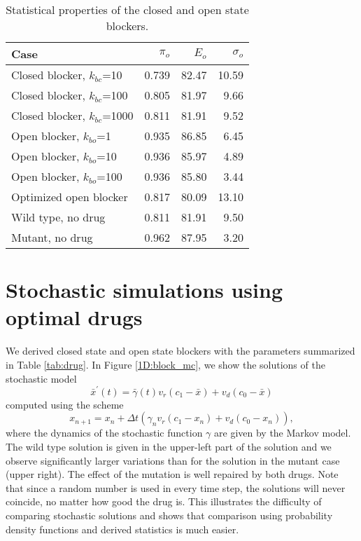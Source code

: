{\begin{table}  \begin{center}
\begin{tabular}{|l|r|r|r|} \hline
Case & $\pi_o$ & $E_o$ & $\sigma_o$  \\ \hline
Closed blocker, $k_{bc}$=10 & 0.739 & 82.47 & 10.59  \\ \hline
Closed blocker, $k_{bc}$=100 & 0.805 & 81.97 & 9.66  \\ \hline
Closed blocker, $k_{bc}$=1000 & 0.811 & 81.91 & 9.52 \\ \hline
Open blocker, $k_{bo}$=1 & 0.935 & 86.85 & 6.45  \\ \hline
Open blocker, $k_{bo}$=10 & 0.936 & 85.97 & 4.89  \\ \hline
Open blocker, $k_{bo}$=100 & 0.936 & 85.80 & 3.44  \\ \hline
Optimized open blocker  & 0.817 & 80.09 & 13.10  \\ \hline \hline
Wild type, no drug & 0.811 & 81.91 & 9.50  \\ \hline
Mutant, no drug & 0.962 & 87.95 & 3.20 \\ \hline
\end{tabular} \end{center}
\caption{Statistical properties of the closed and open state blockers. \label{stat_drug}}
\end{table}


\section[Stochastic simulations]{Stochastic simulations using optimal drugs}
\label{ffgg100}

We derived closed state and open state blockers with the parameters summarized in Table \ref{tab:drug}. 
In Figure \ref{1D:block_mc}, we show the solutions of the stochastic model 
\begin{equation}
\bar{x}^{\prime}(t)=\bar{\gamma}(t)v_{r}(c_{1}-\bar{x})+v_{d}(c_{0}-\bar{x})
\label{asde1D1000}
\end{equation}
 computed 
using the scheme 
\begin{equation}
x_{n+1}=x_{n}+\Delta t\left( \gamma_{n}v_{r}(c_{1}-x_{n})+v_{d}(c_{0}
-x_{n})\right) \label{sde1D_scheme_200},
\end{equation}
where
 the dynamics of the stochastic function $\gamma$ are given by the Markov model. 
 The wild type solution is given in the upper-left part of the solution and we observe significantly larger 
 variations than for the solution in the mutant case (upper right). 
 The effect of the mutation is well repaired by both drugs. 
 Note that since a random number is used in every time step, the solutions will never coincide, no matter how good the drug is. This illustrates the difficulty of comparing stochastic solutions and shows that comparison using probability density functions and derived statistics is much easier.


}
